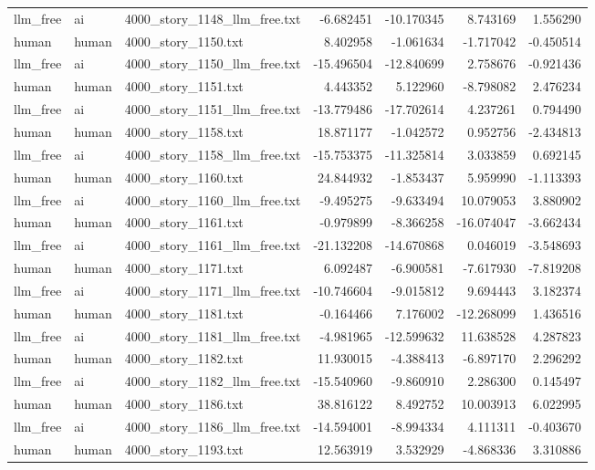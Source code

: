 \begin{longtable}{lllrrrr}
llm\_free & ai & 4000\_story\_1148\_llm\_free.txt & -6.682451 & -10.170345 & 8.743169 & 1.556290 \\
human & human & 4000\_story\_1150.txt & 8.402958 & -1.061634 & -1.717042 & -0.450514 \\
llm\_free & ai & 4000\_story\_1150\_llm\_free.txt & -15.496504 & -12.840699 & 2.758676 & -0.921436 \\
human & human & 4000\_story\_1151.txt & 4.443352 & 5.122960 & -8.798082 & 2.476234 \\
llm\_free & ai & 4000\_story\_1151\_llm\_free.txt & -13.779486 & -17.702614 & 4.237261 & 0.794490 \\
human & human & 4000\_story\_1158.txt & 18.871177 & -1.042572 & 0.952756 & -2.434813 \\
llm\_free & ai & 4000\_story\_1158\_llm\_free.txt & -15.753375 & -11.325814 & 3.033859 & 0.692145 \\
human & human & 4000\_story\_1160.txt & 24.844932 & -1.853437 & 5.959990 & -1.113393 \\
llm\_free & ai & 4000\_story\_1160\_llm\_free.txt & -9.495275 & -9.633494 & 10.079053 & 3.880902 \\
human & human & 4000\_story\_1161.txt & -0.979899 & -8.366258 & -16.074047 & -3.662434 \\
llm\_free & ai & 4000\_story\_1161\_llm\_free.txt & -21.132208 & -14.670868 & 0.046019 & -3.548693 \\
human & human & 4000\_story\_1171.txt & 6.092487 & -6.900581 & -7.617930 & -7.819208 \\
llm\_free & ai & 4000\_story\_1171\_llm\_free.txt & -10.746604 & -9.015812 & 9.694443 & 3.182374 \\
human & human & 4000\_story\_1181.txt & -0.164466 & 7.176002 & -12.268099 & 1.436516 \\
llm\_free & ai & 4000\_story\_1181\_llm\_free.txt & -4.981965 & -12.599632 & 11.638528 & 4.287823 \\
human & human & 4000\_story\_1182.txt & 11.930015 & -4.388413 & -6.897170 & 2.296292 \\
llm\_free & ai & 4000\_story\_1182\_llm\_free.txt & -15.540960 & -9.860910 & 2.286300 & 0.145497 \\
human & human & 4000\_story\_1186.txt & 38.816122 & 8.492752 & 10.003913 & 6.022995 \\
llm\_free & ai & 4000\_story\_1186\_llm\_free.txt & -14.594001 & -8.994334 & 4.111311 & -0.403670 \\
human & human & 4000\_story\_1193.txt & 12.563919 & 3.532929 & -4.868336 & 3.310886 \\

\end{longtable}

